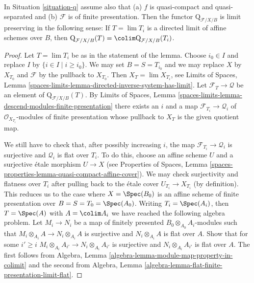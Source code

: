 \begin{lemma}
\label{lemma-q-limit-preserving}
In Situation \ref{situation-q} assume also that
(a) $f$ is quasi-compact and quasi-separated and
(b) $\mathcal{F}$ is of finite presentation.
Then the functor $\text{Q}_{\mathcal{F}/X/B}$
is limit preserving in the following sense: If $T = \lim T_i$ is a
directed limit of affine schemes over $B$, then
$\text{Q}_{\mathcal{F}/X/B}(T) = \colim \text{Q}_{\mathcal{F}/X/B}(T_i)$.
\end{lemma}

\begin{proof}
Let $T = \lim T_i$ be as in the statement of the lemma.
Choose $i_0 \in I$ and replace $I$ by $\{i \in I \mid i \geq i_0\}$.
We may set $B = S = T_{i_0}$ and we may replace $X$ by $X_{T_0}$
and $\mathcal{F}$ by the pullback to $X_{T_0}$. Then
$X_T = \lim X_{T_i}$, see
Limits of Spaces, Lemma
\ref{spaces-limits-lemma-directed-inverse-system-has-limit}.
Let $\mathcal{F}_T \to \mathcal{Q}$ be an element of
$\text{Q}_{\mathcal{F}/X/B}(T)$. By
Limits of Spaces, Lemma
\ref{spaces-limits-lemma-descend-modules-finite-presentation}
there exists an $i$ and a map $\mathcal{F}_{T_i} \to \mathcal{Q}_i$
of $\mathcal{O}_{X_{T_i}}$-modules of finite presentation whose
pullback to $X_T$ is the given quotient map.

\medskip\noindent
We still have to check that, after possibly increasing $i$, the map
$\mathcal{F}_{T_i} \to \mathcal{Q}_i$ is surjective and $\mathcal{Q}_i$
is flat over $T_i$. To do this, choose an affine scheme $U$ and a
surjective \'etale morphism $U \to X$ (see Properties of Spaces,
Lemma \ref{spaces-properties-lemma-quasi-compact-affine-cover}).
We may check surjectivity and flatness over $T_i$ after pulling
back to the \'etale cover $U_{T_i} \to X_{T_i}$ (by definition).
This reduces us to the case where $X = \Spec(B_0)$ is an affine scheme of
finite presentation over $B = S = T_0 = \Spec(A_0)$.
Writing $T_i = \Spec(A_i)$, then $T = \Spec(A)$ with $A = \colim A_i$
we have reached the following algebra problem. Let $M_i \to N_i$
be a map of finitely presented $B_0 \otimes_{A_0} A_i$-modules
such that $M_i \otimes_{A_i} A \to N_i \otimes_{A_i} A$ is surjective
and $N_i \otimes_{A_i} A$ is flat over $A$. Show that for some $i' \geq i$
$M_i \otimes_{A_i} A_{i'} \to N_i \otimes_{A_i} A_{i'}$ is surjective
and $N_i \otimes_{A_i} A_{i'}$ is flat over $A$.
The first follows from
Algebra, Lemma \ref{algebra-lemma-module-map-property-in-colimit}
and the second from
Algebra, Lemma \ref{algebra-lemma-flat-finite-presentation-limit-flat}.
\end{proof}

